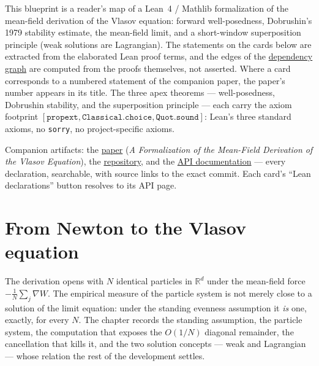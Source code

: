 


This blueprint is a reader's map of a Lean~4 / Mathlib formalization of the mean-field
derivation of the Vlasov equation: forward well-posedness, Dobrushin's 1979 stability
estimate, the mean-field limit, and a short-window superposition principle (weak solutions
are Lagrangian). The statements on the cards below are extracted from the elaborated Lean
proof terms, and the edges of the
\href{https://hydrodynamical.github.io/Vlasov_Meanfield_Formalization/dep_graph_document.html}{dependency
graph} are computed from the proofs themselves, not asserted. Where a card corresponds to a
numbered statement of the companion paper, the paper's number appears in its title. The
three apex theorems --- well-posedness, Dobrushin stability, and the superposition
principle --- each carry the axiom footprint
$[\mathtt{propext}, \mathtt{Classical.choice}, \mathtt{Quot.sound}]$: Lean's three standard
axioms, no \texttt{sorry}, no project-specific axioms.

Companion artifacts:
the \href{https://github.com/Hydrodynamical/Vlasov_Meanfield_Formalization/blob/main/PAPER.pdf}{paper}
(\emph{A Formalization of the Mean-Field Derivation of the Vlasov Equation}),
the \href{https://github.com/Hydrodynamical/Vlasov_Meanfield_Formalization}{repository},
and the \href{https://hydrodynamical.github.io/Vlasov_Meanfield_Formalization/docs/}{API
documentation} --- every declaration, searchable, with source links to the exact commit.
Each card's ``Lean declarations'' button resolves to its API page.

\chapter{From Newton to the Vlasov equation}

The derivation opens with $N$ identical particles in $\mathbb{R}^d$ under the mean-field
force $-\frac{1}{N}\sum_j \nabla W$. The empirical measure of the particle system is not
merely close to a solution of the limit equation: under the standing evenness assumption
it \emph{is} one, exactly, for every $N$. The chapter records the standing assumption, the
particle system, the computation that exposes the $O(1/N)$ diagonal remainder, the
cancellation that kills it, and the two solution concepts --- weak and Lagrangian --- whose
relation the rest of the development settles.

